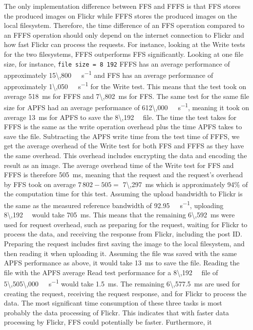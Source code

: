 The only implementation difference between \gls{FFS} and \gls{FFFS} is that \gls{FFS} stores the produced images on Flickr while \gls{FFFS} stores the produced images on the local filesystem. Therefore, the time difference of an \gls{FFS} operation compared to an \gls{FFFS} operation should only depend on the internet connection to Flickr and how fast Flickr can process the requests. For instance, looking at the Write tests for the two filesystems, \gls{FFFS} outperforms \gls{FFS} significantly. Looking at one file size, for instance, \texttt{file size = 8\,192} \gls{FFFS} has an average performance of approximately \SI[per-mode = symbol]{15\,800}{\kilo\byte\per\second} and \gls{FFS} has an average performance of approximately \SI[per-mode = symbol]{1\,050}{\kilo\byte\per\second} for the Write test. This means that the test took on average \SI{518}{\milli\second} for \gls{FFFS} and \SI{7\,802}{\milli\second} for \gls{FFS}. The same test for the same file size for \gls{APFS} had an average performance of \SI[per-mode = symbol]{612\,000}{\kilo\byte\per\second}, meaning it took on average \SI[per-mode = symbol]{13}{\milli\second} for \gls{APFS} to save the \SI[per-mode = symbol]{8\,192}{\kilo\byte} file. The time the test takes for \gls{FFFS} is the same as the write operation overhead plus the time \gls{APFS} takes to save the file. Subtracting the \gls{APFS} write time from the test time of \gls{FFFS}, we get the average overhead of the Write test for both \gls{FFS} and \gls{FFFS} as they have the same overhead. This overhead includes encrypting the data and encoding the result as an image. The average overhead time of the Write test for \gls{FFS} and \gls{FFFS} is therefore \SI[per-mode = symbol]{505}{\milli\second}, meaning that the request and the request's overhead by \gls{FFS} took on average $7\,802 - 505 =$ \SI{7\,297}{\milli\second} which is approximately 94\% of the computation time for this test. Assuming the upload bandwidth to Flickr is the same as the measured reference bandwidth of \SI[per-mode = symbol]{92.95}{\mega\byte\per\second}, uploading \SI[per-mode = symbol]{8\,192}{\kilo\byte} would take \SI[per-mode = symbol]{705}{\milli\second}. This means that the remaining \SI[per-mode = symbol]{6\,592}{\milli\second} were used for request overhead, such as preparing for the request, waiting for Flickr to process the data, and receiving the response from Flickr, including the post ID. Preparing the request includes first saving the image to the local filesystem, and then reading it when uploading it. Assuming the file was saved with the same \gls{APFS} performance as above, it would take \SI[per-mode = symbol]{13}{\milli\second} to save the file. Reading the file with the \gls{APFS} average Read test performance for a \SI[per-mode = symbol]{8\,192}{\kilo\byte} file of \SI[per-mode = symbol]{5\,505\,000}{\kilo\byte\per\second} would take \SI[per-mode = symbol]{1.5}{\milli\second}. The remaining \SI[per-mode = symbol]{6\,577.5}{\milli\second} are used for creating the request, receiving the request response, and for Flickr to process the data. The most significant time consumption of these three tasks is most probably the data processing of Flickr. This indicates that with faster data processing by Flickr, \gls{FFS} could potentially be faster. Furthermore, it 